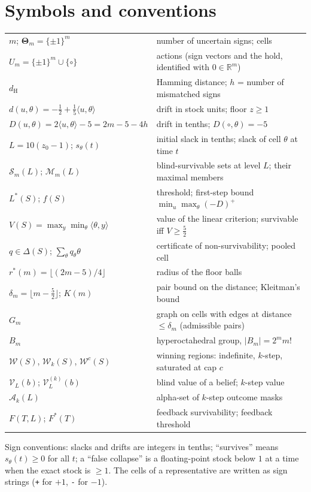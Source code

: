 \documentclass[11pt,a4paper]{article}
\theoremstyle{plain}
\theoremstyle{definition}
\theoremstyle{remark}
\newcommand{\R}{\mathbb{R}}
\newcommand{\calA}{\mathcal{A}}
\newcommand{\calM}{\mathcal{M}}
\newcommand{\calS}{\mathcal{S}}
\newcommand{\calW}{\mathcal{W}}
\let\GreekTheta\Theta
\renewcommand{\Theta}{\boldsymbol{\GreekTheta}}
\newcommand{\dH}{d_{\mathrm{H}}}
\newcommand{\tfr}[2]{\tfrac{#1}{#2}}
\newcommand{\Lstar}{L^{\ast}}
\newcommand{\Fstar}{F^{\ast}}
\begin{document}
\section{Symbols and conventions}\label{S:symbols}
\begin{center}\small
\begin{tabular}{ll}
\toprule
$m$; $\Theta_m=\{\pm1\}^m$ & number of uncertain signs; cells\\
$U_m=\{\pm1\}^m\cup\{\circ\}$ & actions (sign vectors and the hold, identified with $0\in\R^m$)\\
$\dH$ & Hamming distance; $h$ = number of mismatched signs\\
$d(u,\theta)=-\tfr12+\tfr15\langle u,\theta\rangle$ & drift in stock units; floor $z\ge1$\\
$D(u,\theta)=2\langle u,\theta\rangle-5=2m-5-4h$ & drift in tenths; $D(\circ,\theta)=-5$\\
$L=10(z_0-1)$; $s_\theta(t)$ & initial slack in tenths; slack of cell $\theta$ at time $t$\\
$\calS_m(L)$; $\calM_m(L)$ & blind-survivable sets at level $L$; their maximal members\\
$\Lstar(S)$; $f(S)$ & threshold; first-step bound $\min_u\max_\theta(-D)^+$\\
$V(S)=\max_y\min_\theta\langle\theta,y\rangle$ & value of the linear criterion; survivable iff $V\ge\tfr52$\\
$q\in\Delta(S)$; $\sum_\theta q_\theta\theta$ & certificate of non-survivability; pooled cell\\
$r^\ast(m)=\lfloor(2m-5)/4\rfloor$ & radius of the floor balls\\
$\delta_m=\lfloor m-\tfr52\rfloor$; $K(m)$ & pair bound on the distance; Kleitman's bound\\
$G_m$ & graph on cells with edges at distance $\le\delta_m$ (admissible pairs)\\
$B_m$ & hyperoctahedral group, $|B_m|=2^mm!$\\
$\calW(S)$, $\calW_k(S)$, $\calW^{c}(S)$ & winning regions: indefinite, $k$-step, saturated at cap $c$\\
$\mathcal V_L(b)$; $\mathcal V^{(k)}_L(b)$ & blind value of a belief; $k$-step value\\
$\calA_k(L)$ & alpha-set of $k$-step outcome masks\\
$F(T,L)$; $\Fstar(T)$ & feedback survivability; feedback threshold\\
\bottomrule
\end{tabular}
\end{center}
Sign conventions: slacks and drifts are integers in tenths; ``survives'' means $s_\theta(t)\ge0$ for all $t$; a ``false collapse'' is a floating-point stock below $1$ at a time when the exact stock is $\ge1$. The cells of a representative are written as sign strings (\texttt{+} for $+1$, \texttt{-} for $-1$).
\end{document}
